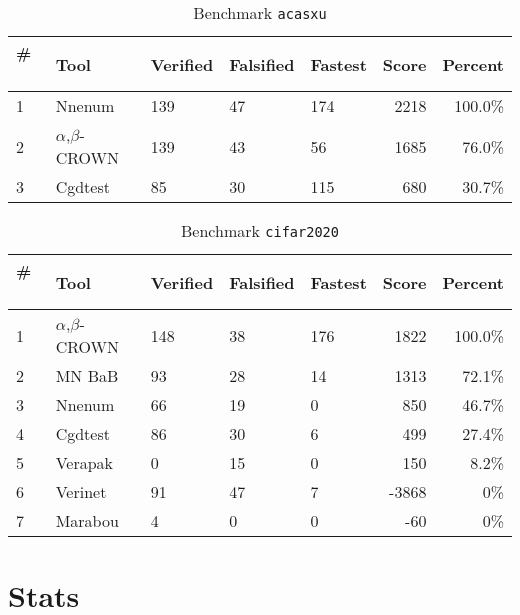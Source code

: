 
\begin{table}[h]
\begin{center}
\caption{Benchmark \texttt{acasxu}} \label{tab:cat_{cat}}
{\setlength{\tabcolsep}{2pt}
\begin{tabular}[h]{@{}lllllrr@{}}
\toprule
\textbf{\# ~} & \textbf{Tool} & \textbf{Verified} & \textbf{Falsified} & \textbf{Fastest} & \textbf{Score} & \textbf{Percent}\\
\midrule
1 & Nnenum & 139 & 47 & 174 & 2218 & 100.0\% \\
2 & $\alpha$,$\beta$-CROWN & 139 & 43 & 56 & 1685 & 76.0\% \\
3 & Cgdtest & 85 & 30 & 115 & 680 & 30.7\% \\
\bottomrule
\end{tabular}
}
\end{center}
\end{table}



\begin{table}[h]
\begin{center}
\caption{Benchmark \texttt{cifar2020}} \label{tab:cat_{cat}}
{\setlength{\tabcolsep}{2pt}
\begin{tabular}[h]{@{}lllllrr@{}}
\toprule
\textbf{\# ~} & \textbf{Tool} & \textbf{Verified} & \textbf{Falsified} & \textbf{Fastest} & \textbf{Score} & \textbf{Percent}\\
\midrule
1 & $\alpha$,$\beta$-CROWN & 148 & 38 & 176 & 1822 & 100.0\% \\
2 & MN BaB & 93 & 28 & 14 & 1313 & 72.1\% \\
3 & Nnenum & 66 & 19 & 0 & 850 & 46.7\% \\
4 & Cgdtest & 86 & 30 & 6 & 499 & 27.4\% \\
5 & Verapak & 0 & 15 & 0 & 150 & 8.2\% \\
6 & Verinet & 91 & 47 & 7 & -3868 & 0\% \\
7 & Marabou & 4 & 0 & 0 & -60 & 0\% \\
\bottomrule
\end{tabular}
}
\end{center}
\end{table}


\section{Stats}

